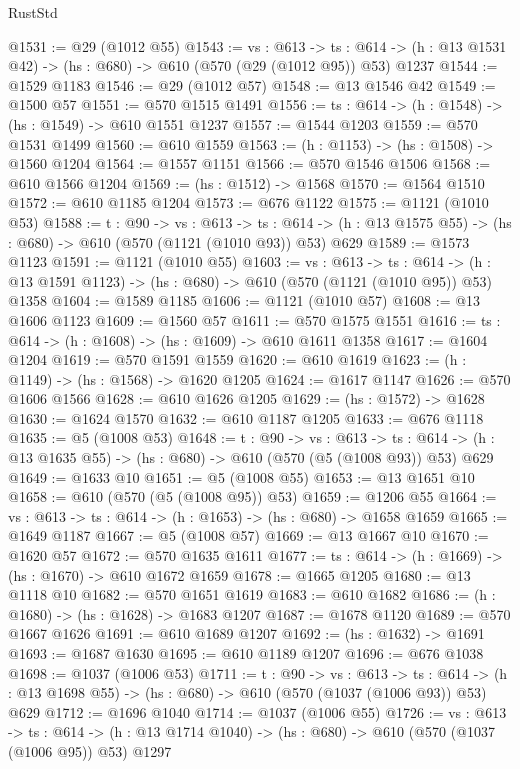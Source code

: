 \begin{lexlean}{RustStd}
\begin{coremodule}
@1531 := @29 (@1012 @55)
@1543 := {vs : @613} ->
  {ts : @614} -> (h : @13 @1531 @42) -> (hs : @680) -> @610 (@570 (@29 (@1012 @95)) @53) @1237
@1544 := @1529 @1183
@1546 := @29 (@1012 @57)
@1548 := @13 @1546 @42
@1549 := @1500 @57
@1551 := @570 @1515 @1491
@1556 := {ts : @614} -> (h : @1548) -> (hs : @1549) -> @610 @1551 @1237
@1557 := @1544 @1203
@1559 := @570 @1531 @1499
@1560 := @610 @1559
@1563 := (h : @1153) -> (hs : @1508) -> @1560 @1204
@1564 := @1557 @1151
@1566 := @570 @1546 @1506
@1568 := @610 @1566 @1204
@1569 := (hs : @1512) -> @1568
@1570 := @1564 @1510
@1572 := @610 @1185 @1204
@1573 := @676 @1122
@1575 := @1121 (@1010 @53)
@1588 := {t : @90} ->
  {vs : @613} ->
  {ts : @614} -> (h : @13 @1575 @55) -> (hs : @680) -> @610 (@570 (@1121 (@1010 @93)) @53) @629
@1589 := @1573 @1123
@1591 := @1121 (@1010 @55)
@1603 := {vs : @613} ->
  {ts : @614} -> (h : @13 @1591 @1123) -> (hs : @680) -> @610 (@570 (@1121 (@1010 @95)) @53) @1358
@1604 := @1589 @1185
@1606 := @1121 (@1010 @57)
@1608 := @13 @1606 @1123
@1609 := @1560 @57
@1611 := @570 @1575 @1551
@1616 := {ts : @614} -> (h : @1608) -> (hs : @1609) -> @610 @1611 @1358
@1617 := @1604 @1204
@1619 := @570 @1591 @1559
@1620 := @610 @1619
@1623 := (h : @1149) -> (hs : @1568) -> @1620 @1205
@1624 := @1617 @1147
@1626 := @570 @1606 @1566
@1628 := @610 @1626 @1205
@1629 := (hs : @1572) -> @1628
@1630 := @1624 @1570
@1632 := @610 @1187 @1205
@1633 := @676 @1118
@1635 := @5 (@1008 @53)
@1648 := {t : @90} ->
  {vs : @613} ->
  {ts : @614} -> (h : @13 @1635 @55) -> (hs : @680) -> @610 (@570 (@5 (@1008 @93)) @53) @629
@1649 := @1633 @10
@1651 := @5 (@1008 @55)
@1653 := @13 @1651 @10
@1658 := @610 (@570 (@5 (@1008 @95)) @53)
@1659 := @1206 @55
@1664 := {vs : @613} -> {ts : @614} -> (h : @1653) -> (hs : @680) -> @1658 @1659
@1665 := @1649 @1187
@1667 := @5 (@1008 @57)
@1669 := @13 @1667 @10
@1670 := @1620 @57
@1672 := @570 @1635 @1611
@1677 := {ts : @614} -> (h : @1669) -> (hs : @1670) -> @610 @1672 @1659
@1678 := @1665 @1205
@1680 := @13 @1118 @10
@1682 := @570 @1651 @1619
@1683 := @610 @1682
@1686 := (h : @1680) -> (hs : @1628) -> @1683 @1207
@1687 := @1678 @1120
@1689 := @570 @1667 @1626
@1691 := @610 @1689 @1207
@1692 := (hs : @1632) -> @1691
@1693 := @1687 @1630
@1695 := @610 @1189 @1207
@1696 := @676 @1038
@1698 := @1037 (@1006 @53)
@1711 := {t : @90} ->
  {vs : @613} ->
  {ts : @614} -> (h : @13 @1698 @55) -> (hs : @680) -> @610 (@570 (@1037 (@1006 @93)) @53) @629
@1712 := @1696 @1040
@1714 := @1037 (@1006 @55)
@1726 := {vs : @613} ->
  {ts : @614} -> (h : @13 @1714 @1040) -> (hs : @680) -> @610 (@570 (@1037 (@1006 @95)) @53) @1297

\end{coremodule}
\end{lexlean}
